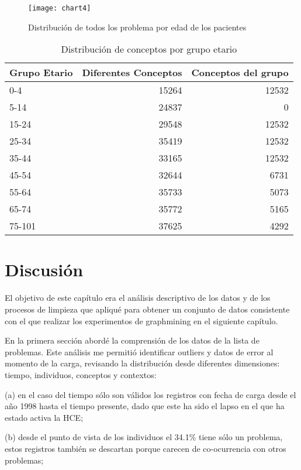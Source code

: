 \begin{figure}[ht]
\caption{Distribución de todos los problema por edad de los pacientes}
\label{fig:listaEdad}
\centering
\texttt{[image: chart4]}
\end{figure}

\begin{table}[htb]
\centering
\caption{Distribución de conceptos por grupo etario }
\label{grupo_etario}
\begin{tabular}{@{}lrr@{}}
\toprule
Grupo Etario & Diferentes Conceptos & Conceptos del grupo \\ \midrule
0-4 & \num{15264} & \num{12532} \\
5-14 & \num{24837} & \num{0} \\
15-24 & \num{29548} & \num{12532} \\
25-34 & \num{35419} & \num{12532} \\
35-44 & \num{33165} & \num{12532} \\
45-54 & \num{32644} & \num{6731} \\
55-64 & \num{35733} & \num{5073} \\
65-74 & \num{35772} & \num{5165} \\
75-101 & \num{37625} & \num{4292} \\ \bottomrule
\end{tabular}
\end{table}

\section{Discusión}
El objetivo de este capítulo era el análisis descriptivo de los datos y de los procesos de limpieza que apliqué para obtener un conjunto de datos consistente con el que realizar los experimentos de graphmining en el siguiente capítulo.

En la primera sección abordé la comprensión de los datos de la lista de problemas. Este análisis me permitió identificar outliers y datos de error al momento de la carga, revisando la distribución desde diferentes dimensiones: tiempo, individuos, conceptos y contextos: 

(a) en el caso del tiempo sólo son válidos los registros con fecha de carga desde el año 1998 hasta el tiempo presente, dado que este ha sido el lapso en el que ha estado activa la HCE; 

(b) desde el punto de vista de los individuos  el 34.1\% tiene sólo un problema, estos registros también se descartan porque carecen de co-ocurrencia con otros problemas; 

